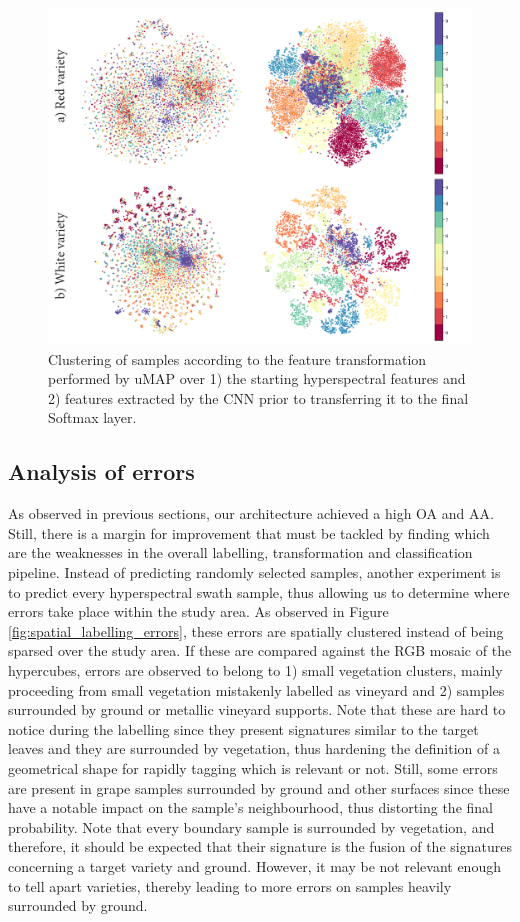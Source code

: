 \begin{figure}[ht]
    \centering
    \includegraphics[width=\linewidth]{figs/vineyard_classification/separability.png}
	\caption{Clustering of samples according to the feature transformation performed by uMAP over 1) the starting hyperspectral features and 2) features extracted by the CNN prior to transferring it to the final Softmax layer. }
	\label{fig:separability_umap}
\end{figure}

\subsection{Analysis of errors}

As observed in previous sections, our architecture achieved a high OA and AA. Still, there is a margin for improvement that must be tackled by finding which are the weaknesses in the overall labelling, transformation and classification pipeline. Instead of predicting randomly selected samples, another experiment is to predict every hyperspectral swath sample, thus allowing us to determine where errors take place within the study area. As observed in Figure \ref{fig:spatial_labelling_errors}, these errors are spatially clustered instead of being sparsed over the study area. If these are compared against the RGB mosaic of the hypercubes, errors are observed to belong to 1) small vegetation clusters, mainly proceeding from small vegetation mistakenly labelled as vineyard and 2) samples surrounded by ground or metallic vineyard supports. Note that these are hard to notice during the labelling since they present signatures similar to the target leaves and they are surrounded by vegetation, thus hardening the definition of a geometrical shape for rapidly tagging which is relevant or not. Still, some errors are present in grape samples surrounded by ground and other surfaces since these have a notable impact on the sample's neighbourhood, thus distorting the final probability. Note that every boundary sample is surrounded by vegetation, and therefore, it should be expected that their signature is the fusion of the signatures concerning a target variety and ground. However, it may be not relevant enough to tell apart varieties, thereby leading to more errors on samples heavily surrounded by ground.

